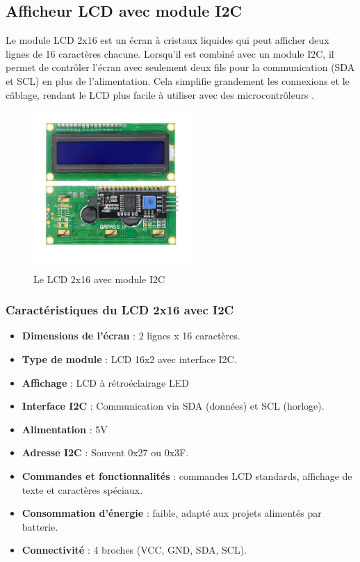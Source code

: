\subsection{Afficheur LCD avec module I2C}
Le module LCD 2x16 est un écran à cristaux liquides qui peut afficher deux lignes de 16 caractères chacune. Lorsqu'il est combiné avec un module I2C, il permet de contrôler l'écran avec seulement deux fils pour la communication (SDA et SCL) en plus de l'alimentation. Cela simplifie grandement les connexions et le câblage, rendant le LCD plus facile à utiliser avec des microcontrôleurs  \cite{6}.
\begin{figure}[H]
	\centering
	\includegraphics[width=6cm]{./img/composants/lcdI2C.jpeg}
	\caption{Le LCD 2x16 avec module I2C  \cite{6}}
	\label{i1}
\end{figure}
\subsubsection*{Caractéristiques du LCD 2x16 avec I2C}

\begin{itemize}[label={--}]
	\item \textbf{Dimensions de l'écran} : 2 lignes x 16 caractères.
	\item \textbf{Type de module} : LCD 16x2 avec interface I2C.
	\item \textbf{Affichage} : LCD à rétroéclairage LED
	\item \textbf{Interface I2C} : Communication via SDA (données) et SCL (horloge).
	\item \textbf{Alimentation} : 5V
	\item \textbf{Adresse I2C} : Souvent 0x27 ou 0x3F.
	\item \textbf{Commandes et fonctionnalités} : commandes LCD standards, affichage de texte et caractères spéciaux.
	\item \textbf{Consommation d'énergie} : faible, adapté aux projets alimentés par batterie.
	\item \textbf{Connectivité} : 4 broches (VCC, GND, SDA, SCL).
\end{itemize}

